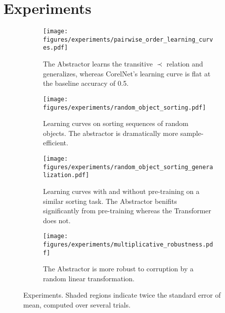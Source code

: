 
\section{Experiments}\label{sec:experiments}

\begin{figure}
    \centering
    \begin{subfigure}[t]{0.45\textwidth}
        \centering
        \texttt{[image: figures/experiments/pairwise\_order\_learning\_curves.pdf]}
        \caption{The Abstractor learns the transitive $\prec$ relation and generalizes, whereas CorelNet's learning curve is flat at the baseline accuracy of 0.5.}\label{fig:exp_order_relation}
    \end{subfigure} \hspace{\fill}
    \begin{subfigure}[t]{0.45\textwidth}
        \centering
        \texttt{[image: figures/experiments/random\_object\_sorting.pdf]}
        \caption{Learning curves on sorting sequences of random objects. The abstractor is dramatically more sample-efficient.}\label{fig:exp_object_sorting}
    \end{subfigure}

    \bigskip
    \begin{subfigure}[t]{0.45\textwidth}
        \centering
        \texttt{[image: figures/experiments/random\_object\_sorting\_generalization.pdf]}
        \caption{Learning curves with and without pre-training on a similar sorting task. The Abstractor benifits significantly from pre-training whereas the Transformer does not.}\label{fig:exp_object_sorting_generalization}
    \end{subfigure} \hspace{\fill}
    \begin{subfigure}[t]{0.45\textwidth}
        \centering
        \texttt{[image: figures/experiments/multiplicative\_robustness.pdf]}
        \caption{The Abstractor is more robust to corruption by a random linear transformation.}\label{fig:exp_robustness}
    \end{subfigure}
    \caption{Experiments. Shaded regions indicate twice the standard error of mean, computed over several trials.}\label{fig:experiments}
\end{figure}


